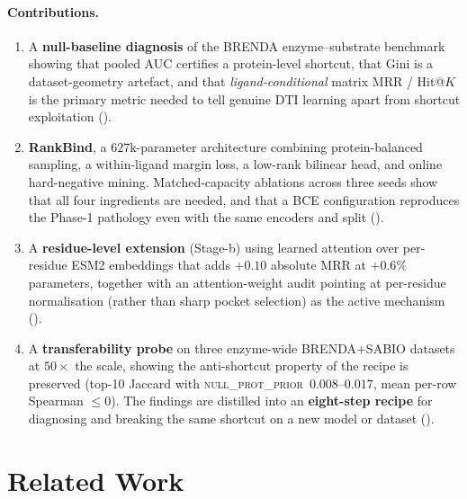 \documentclass[11pt,a4paper]{article}
\newcommand{\method}{RankBind\xspace}
\newcommand{\nullprior}{\textsc{null\_prot\_prior}\xspace}
\begin{document}
\paragraph{Contributions.}
\begin{enumerate}[leftmargin=*,itemsep=0pt,topsep=2pt]
  \item A \textbf{null-baseline diagnosis} of the BRENDA enzyme--substrate
        benchmark showing that pooled AUC certifies a protein-level
        shortcut, that Gini is a dataset-geometry artefact, and that
        \emph{ligand-conditional} matrix MRR / Hit@$K$ is the primary
        metric needed to tell genuine DTI learning apart from shortcut
        exploitation ().
  \item \textbf{\method}, a $627$k-parameter architecture combining
        protein-balanced sampling, a within-ligand margin loss, a
        low-rank bilinear head, and online hard-negative mining.
        Matched-capacity ablations across three seeds show that all
        four ingredients are needed, and that a BCE configuration
        reproduces the Phase-1 pathology even with the same encoders
        and split ().
  \item A \textbf{residue-level extension} (Stage-b) using learned
        attention over per-residue ESM2 embeddings that adds $+0.10$
        absolute MRR at $+0.6\%$ parameters, together with an
        attention-weight audit pointing at per-residue normalisation
        (rather than sharp pocket selection) as the active mechanism
        ().
  \item A \textbf{transferability probe} on three enzyme-wide
        BRENDA+SABIO datasets at $50\times$ the scale, showing the
        anti-shortcut property of the recipe is preserved (top-10
        Jaccard with \nullprior\ $0.008$--$0.017$, mean per-row
        Spearman $\le 0$). The findings are distilled into an
        \textbf{eight-step recipe} for diagnosing and breaking the
        same shortcut on a new model or dataset
        ().
\end{enumerate}

\section{Related Work}
\label{sec:related}
\end{document}
